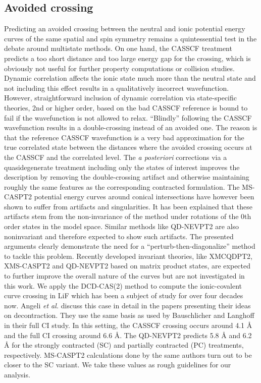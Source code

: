 \subsection{Avoided crossing}

Predicting an avoided crossing between the neutral and ionic potential energy curves of the same spatial and spin symmetry remains a quintessential test in the debate around multistate methods.\cite{SpiegM_1984_1235, SpiegM_1984_1259, SivalKAN_2016_54104} On one hand, the CASSCF treatment predicts a too short distance and too large energy gap for the crossing, which is obviously not useful for further property computations or collision studies.  Dynamic correlation affects the ionic state much more than the neutral state and not including this effect results in a qualitatively incorrect wavefunction. However, straightforward inclusion of dynamic correlation via state-specific theories, 2nd or higher order, based on the bad CASSCF reference is bound to fail if the wavefunction is not allowed to relax. ``Blindly'' following the CASSCF wavefunction results in a double-crossing instead of an avoided one. The reason is that the reference CASSCF wavefunction is a very bad approximation for the true correlated state between the distances where the avoided crossing occurs at the CASSCF and the correlated level. The \textit{a posteriori} corrections via a quasidegenerate treatment including only the states of interest improves the description by removing the double-crossing artifact and otherwise maintaining roughly the same features as the corresponding contracted formulation. The MS-CASPT2 potential energy curves around conical intersections have however been shown to suffer from artifacts and singularities.\cite{Grano_2011_214113, SerraML_2005_104107, DeViPHSR_2008_136} It has been explained that these artifacts stem from the non-invariance of the method under rotations of the 0th order states in the model space.\cite{Grano_2011_214113} Similar methods like QD-NEVPT2 are also noninvariant and therefore expected to show such artifacts.\cite{Grano_2011_214113, SharmJA_2016_34103}
The presented arguments clearly demonstrate the need for a “perturb-then-diagonalize” method to tackle this problem. Recently developed invariant theories, like XMCQDPT2, XMS-CASPT2 and QD-NEVPT2 based on matrix product states, are expected to further improve the overall nature of the curves but are not investigated in this work. We apply the DCD-CAS(2) method to compute the ionic-covalent curve crossing in LiF which has been a subject of study for over four decades now.\cite{BauscL_1988_4246, KahnHS_1974_3530, WerneM_1981_5802} Angeli \textit{et al.} discuss this case in detail in the papers presenting their ideas on decontraction.\cite{AngelBCC_2004_4043, AngelCCM_2006_234109} They use the same basis as used by Bauschlicher and Langhoff in their full CI study.\cite{BauscL_1988_4246} In this setting, the CASSCF crossing occurs around 4.1 Å and the full CI crossing around 6.6 Å. The QD-NEVPT2 predicts 5.8 Å and 6.2 Å for the strongly contracted (SC) and partially contracted (PC) treatments, respectively. MS-CASPT2 calculations done by the same authors turn out to be closer to the SC variant. We take these values as rough guidelines for our analysis. 
